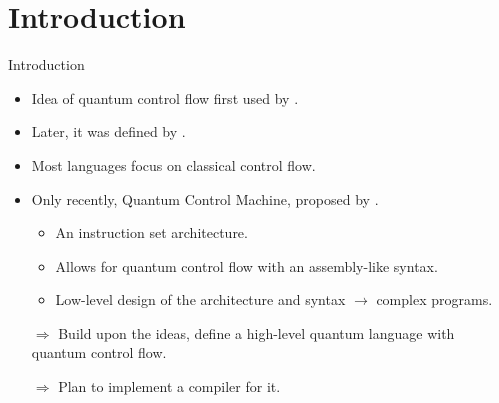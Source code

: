 \section{Introduction}


\begin{frame}{Introduction}
    \begin{itemize}
        \item Idea of quantum control flow first used by \cite{AlGr05}.
        \item Later, it was defined by \cite{YYF12}.
        \item Most languages focus on classical control flow.
        \item Only recently, Quantum Control Machine, proposed by \cite{YVC24}.
        \begin{itemize}
            \item An instruction set architecture.
            \item Allows for quantum control flow with an assembly-like syntax.
            \item Low-level design of the architecture and syntax $\to$ complex programs.
        \end{itemize}
        \item[$\Rightarrow$] Build upon the ideas, define a high-level quantum language with quantum control flow.
        \item[$\Rightarrow$] Plan to implement a compiler for it.
    \end{itemize}
\end{frame}